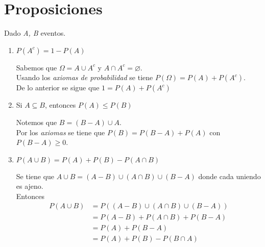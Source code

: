\section{Proposiciones}
Dado \textit{A, B} eventos.
\begin{enumerate}
  \item $P(A^c) = 1 - P(A)$
    \begin{myproof}
      Sabemos que $\Omega = A \cup A^c$ y $A \cap A^c = \varnothing$. \\
      Usando los \textit{axiomas de probabilidad} se tiene $P(\Omega) = P(A) + P(A^c)$.\\
      De lo anterior se sigue que $1 = P(A) + P(A^c)$
      \begin{center}  \end{center}
    \end{myproof}

    \newpage
  \item Si $A \subseteq B$, entonces $P(A) \le P(B)$
    \begin{myproof}
      Notemos que $B = (B - A) \cup A$.\\ 
      Por los \textit{axiomas} se tiene que $P(B) = P(B-A) + P(A)$ con $P(B - A) \ge 0$.
      \begin{center}  \end{center}
    \end{myproof}
    
  \item $P(A \cup B) = P(A) + P(B) - P(A \cap B)$
    \begin{myproof}
      Se tiene que $A \cup B = (A - B) \cup (A \cap B) \cup (B - A)$ donde cada uniendo es ajeno.\\
      Entonces
      \begin{align*}
         P(A \cup B) &= P((A - B) \cup (A \cap B) \cup (B - A))\\
                  &= P(A-B) + P(A \cap B) + P(B-A)\\
                  &= P(A) + P(B-A)\\
                  &= P(A)  + P(B) - P(B \cap A)\\
      \end{align*}
    \end{myproof}
\end{enumerate}

